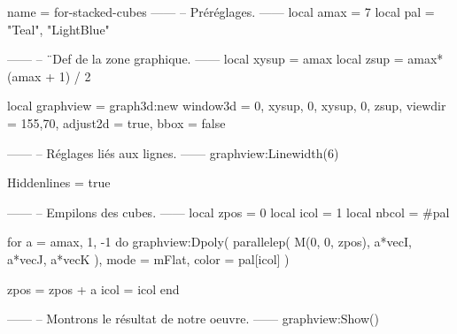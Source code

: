 \documentclass[border = 3pt]{standalone}
\begin{document}
\begin{luadraw}{name = for-stacked-cubes}
------
-- Préréglages.
------
local amax = 7
local pal  = {"Teal", "LightBlue"}

------
-- ¨Def de la zone graphique.
------
local xysup = amax
local zsup  = amax*(amax + 1) / 2

local graphview = graph3d:new{
  window3d = {0, xysup, 0, xysup, 0, zsup},
  viewdir  = {155,70},
  adjust2d = true,
  bbox     = false
}

------
-- Réglages liés aux lignes.
------
graphview:Linewidth(6)

Hiddenlines = true

------
-- Empilons des cubes.
------
local zpos  = 0
local icol  = 1
local nbcol = #pal

for a = amax, 1, -1 do
  graphview:Dpoly(
    parallelep(
      M(0, 0, zpos),
      a*vecI, a*vecJ, a*vecK
    ),
    {
      mode  = mFlat,
      color = pal[icol]
    }
  )

  zpos = zpos + a
  icol = icol %
end

------
-- Montrons le résultat de notre oeuvre.
------
graphview:Show()
\end{luadraw}
\end{document}

